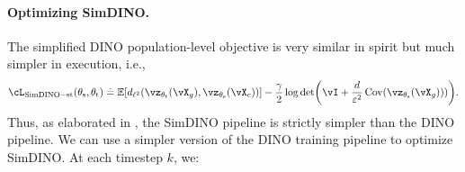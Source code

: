 \documentclass[../../book-main.tex]{subfiles}
\begin{document}
\paragraph{Optimizing SimDINO.} The simplified DINO population-level objective is very similar in spirit but much simpler in execution, i.e.,
\begin{equation}\label{eq:simdino_loss_teacherstudent}
    \cL_{\simdino-\student\teacher}(\theta_{\student}, \theta_{\teacher}) \doteq
    \Ex\rs{d_{\ell^{2}}(\vz_{\theta_{\teacher}}(\vX_{g}),
    \vz_{\theta_{\student}}(\vX_{c}))} - \frac{\gamma}{2}\log\det\rp{\vI + \frac{d}{\eps^{2}}\Cov(\vz_{\theta_{\student}}(\vX_{g})))}.
\end{equation}
Thus, as elaborated in , the SimDINO pipeline is strictly simpler than the DINO pipeline. We can use a simpler version of the DINO training pipeline to optimize SimDINO. At each timestep \(k\), we:
\end{document}
